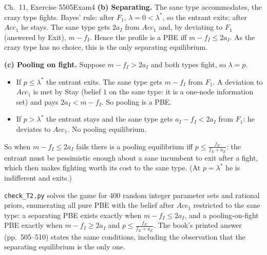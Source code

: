 \begin{exsol}{\MG{} Ch.~11, Exercise 5}{505}{Exam}{4}
\textbf{(b) Separating.} The sane type accommodates, the crazy type fights. Bayes' rule: after
$F_1$, $\lambda = 0 < \lambda^*$, so the entrant exits; after $Acc_1$ he stays. The sane type gets
$2a_I$ from $Acc_1$ and, by deviating to $F_1$ (answered by Exit), $m - f_I$. Hence the profile is a PBE
iff $m - f_I \le 2a_I$. As the crazy type has no choice, this is the only separating equilibrium.

\textbf{(c) Pooling on fight.} Suppose $m - f_I > 2a_I$ and both types fight, so $\lambda = p$.
\begin{itemize}
  \item If $p \le \lambda^*$ the entrant exits. The sane type gets $m - f_I$ from $F_1$. A deviation to
  $Acc_1$ is met by Stay (belief $1$ on the sane type: it is a one-node information set) and pays
  $2a_I < m - f_I$. So pooling is a PBE.
  \item If $p > \lambda^*$ the entrant stays and the sane type gets $a_I - f_I < 2a_I$ from $F_1$:
  he deviates to $Acc_1$. No pooling equilibrium.
\end{itemize}
So when $m - f_I \le 2a_I$ fails there is a pooling equilibrium iff $p \le \frac{f_E}{f_E + a_E}$: the
entrant must be pessimistic enough about a sane incumbent to exit after a fight, which then makes
fighting worth its cost to the sane type. (At $p = \lambda^*$ he is indifferent and exits.)

\verify \texttt{check\_T2.py} solves the game for 400 random integer parameter sets and rational priors,
enumerating all pure PBE with the belief after $Acc_1$ restricted to the sane type: a separating PBE
exists exactly when $m - f_I \le 2a_I$, and a pooling-on-fight PBE exactly when $m - f_I \ge 2a_I$
and $p \le \frac{f_E}{f_E + a_E}$. The book's printed answer (pp.~505--510) states the same
conditions, including the observation that the separating equilibrium is the only one.

\end{exsol}
